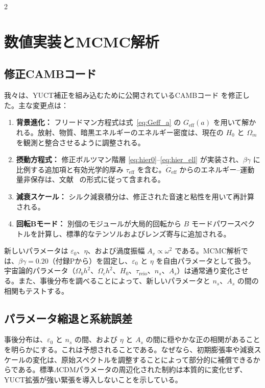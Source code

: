 \documentclass[11pt,a4paper]{article}
\begin{document}
	\begin{multicols}{2}
		
		\section{数値実装とMCMC解析}
		
		\subsection{修正CAMBコード}
		
		我々は、YUCT補正を組み込むために公開されているCAMBコード \cite{Lewis2000} を修正した。主な変更点は：
		\begin{enumerate}
			\item \textbf{背景進化：} フリードマン方程式は式~\eqref{eq:Geff_a} の \(G_{\mathrm{eff}}(a)\) を用いて解かれる。放射、物質、暗黒エネルギーのエネルギー密度は、現在の \(H_0\) と \(\Omega_m\) を観測と整合させるように調整される。
			\item \textbf{摂動方程式：} 修正ボルツマン階層 \eqref{eq:hier0}--\eqref{eq:hier_ell} が実装され、\(\beta\gamma\) に比例する追加項と有効光学的厚み \(\tau_{\mathrm{eff}}\) を含む。\(\dot{G}_{\mathrm{eff}}\) からのエネルギー–運動量非保存は、文献~\cite{Uzan2011} の形式に従って含まれる。
			\item \textbf{減衰スケール：} シルク減衰積分は、修正された音速と粘性を用いて再計算される。
			\item \textbf{回転Bモード：} 別個のモジュールが大局的回転から \(B\) モードパワースペクトルを計算し、標準的なテンソルおよびレンズ寄与に追加される。
		\end{enumerate}
		新しいパラメータは \(\varepsilon_0\)、\(\eta\)、および渦度振幅 \(A_v \propto \omega^2\) である。MCMC解析では、\(\beta\gamma = 0.20\)（付録Pから）を固定し、\(\varepsilon_0\) と \(\eta\) を自由パラメータとして扱う。宇宙論的パラメータ（\(\Omega_b h^2\)、\(\Omega_c h^2\)、\(H_0\)、\(\tau_{\mathrm{reio}}\)、\(n_s\)、\(A_s\)）は通常通り変化させる。また、事後分布を調べることによって、新しいパラメータと \(n_s\)、\(A_s\) の間の相関もテストする。
		
		\subsection{パラメータ縮退と系統誤差}
		
		事後分布は、\(\varepsilon_0\) と \(n_s\) の間、および \(\eta\) と \(A_s\) の間に穏やかな正の相関があることを明らかにする。これは予想されることである。なぜなら、初期膨張率や減衰スケールの変化は、原始スペクトルを調整することによって部分的に補償できるからである。標準\(\Lambda\)CDMパラメータの周辺化された制約は本質的に変化せず、YUCT拡張が強い緊張を導入しないことを示している。
		

\end{multicols}
\end{document}
